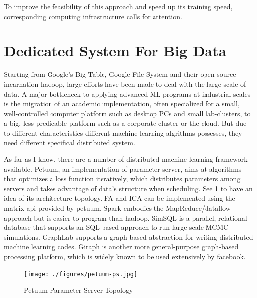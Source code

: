\documentclass[a4paper]{book}
\begin{document}
  To improve the feasibility of this approach and speed up its training
  speed, corresponding computing infrastructure calls for attention.

  \section{Dedicated System For Big Data}
  Starting from Google's Big Table\cite{Chang:2006:BDS:1267308.1267323},
  Google File System\cite{Ghemawat:2003:GFS:945445.945450} and their
  open source incarnation hadoop, large efforts have been made to deal
  with the large scale of data. A major bottleneck to applying advanced
  ML programs at industrial scales is the migration of an academic
  implementation, often specialized for a small, well-controlled
  computer platform such as desktop PCs and small lab-clusters, to a
  big, less predicable platform such as a corporate cluster or the
  cloud\cite{2013arXiv1312.7651D}.  But due to different characteristics
  different machine learning algrithms possesses, they need different
  specifical distributed system.

  As far as I know, there are a number of distributed machine learning
  framework available. Petuum\cite{2013arXiv1312.7651D}, an
  implementation of parameter server, aims at algorithms that optimizes
  a loss function iteratively, which distributes parameters among
  servers and takes advantage of data's structure when scheduling. See
  \cref{fig:petuum_ps.jpg} to have an idea of its architecture topology.
  FA and ICA can be implemented using the matrix api provided by petuum.
  Spark\cite{Zaharia:2010:SCC:1863103.1863113} embodies the
  MapReduce/dataflow approach but is easier to program than hadoop.
  SimSQL\cite{Cai:2013:SDM:2463676.2465283} is a parallel, relational
  database that supports an SQL-based approach to run large-scale MCMC
  simulations. GraphLab\cite{Low+al:uai10graphlab} supports a
  graph-based abstraction for writing distributed machine learning
  codes. Giraph is another more general-purpose graph-based processing
  platform, which is widely known to be used extensively by facebook.

  \begin{figure}[h]
    \begin{center}
      \texttt{[image: ./figures/petuum-ps.jpg]}
      \caption{Petuum Parameter Server Topology\label{fig:petuum_ps.jpg}}
    \end{center}
  \end{figure}
\end{document}
